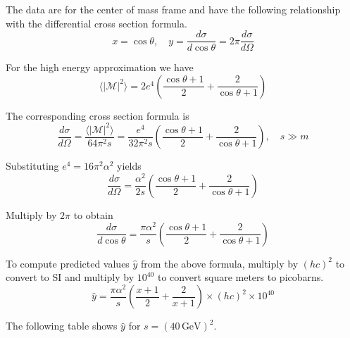 \documentclass[12pt]{article}
\begin{document}
The data are for the center of mass frame and have the following relationship with the differential cross section formula.
\begin{equation*}
x=\cos\theta,
\quad
y=\frac{d\sigma}{d\cos\theta}=2\pi\frac{d\sigma}{d\Omega}
\end{equation*}

For the high energy approximation we have
\begin{equation*}
\langle|\mathcal{M}|^2\rangle
=
2e^4\left(
\frac{\cos\theta+1}{2}+\frac{2}{\cos\theta+1}
\right)
\end{equation*}

The corresponding cross section formula is
\begin{equation*}
\frac{d\sigma}{d\Omega}
=\frac{\langle|\mathcal{M}|^2\rangle}{64\pi^2s}
=\frac{e^4}{32\pi^2s}
\left(
\frac{\cos\theta+1}{2}+\frac{2}{\cos\theta+1}
\right),\quad s\gg m
\end{equation*}

Substituting $e^4=16\pi^2\alpha^2$ yields
\begin{equation*}
\frac{d\sigma}{d\Omega}
=\frac{\alpha^2}{2s}
\left(
\frac{\cos\theta+1}{2}+\frac{2}{\cos\theta+1}
\right)
\end{equation*}

Multiply by $2\pi$ to obtain
\begin{equation*}
\frac{d\sigma}{d\cos\theta}
=\frac{\pi\alpha^2}{s}\left(
\frac{\cos\theta+1}{2}+\frac{2}{\cos\theta+1}
\right)
\end{equation*}

To compute predicted values $\hat{y}$ from the above formula,
multiply by $(hc)^2$ to convert to SI
and multiply by $10^{40}$ to convert square meters to picobarns.
\begin{equation*}
\hat{y}
=
\frac{\pi\alpha^2}{s}
\left(
\frac{x+1}{2}+
\frac{2}{x+1}
\right)
\times(hc)^2
\times10^{40}
\end{equation*}

The following table shows $\hat{y}$
for $s=(40\,\text{GeV})^2$.
\end{document}

